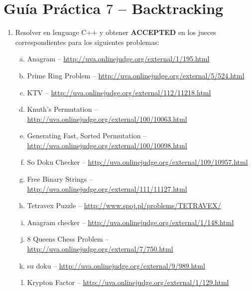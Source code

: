 




\section*{Gu\'ia Pr\'actica $7$ -- Backtracking}

\begin{enumerate}[1 -]
	
	\item Resolver en lenguage C++ y obtener \textbf{ACCEPTED} en los jueces correspondientes para los siguientes problemas:
	
	\begin{enumerate}[a)]
		\item Anagram -- \href{http://uva.onlinejudge.org/external/1/195.html}{http://uva.onlinejudge.org/external/1/195.html}
		\item Prime Ring Problem -- \href{http://uva.onlinejudge.org/external/5/524.html}{http://uva.onlinejudge.org/external/5/524.html}
		\item KTV -- \href{http://uva.onlinejudge.org/external/112/11218.html}{http://uva.onlinejudge.org/external/112/11218.html}
		\item Knuth’s Permutation -- \href{http://uva.onlinejudge.org/external/100/10063.html}{http://uva.onlinejudge.org/external/100/10063.html}
		\item Generating Fast, Sorted Permutation -- \href{http://uva.onlinejudge.org/external/100/10098.html}{http://uva.onlinejudge.org/external/100/10098.html}
		\item So Doku Checker -- \href{http://uva.onlinejudge.org/external/109/10957.html}{http://uva.onlinejudge.org/external/109/10957.html}
		\item Free Binary Strings -- \href{http://uva.onlinejudge.org/external/111/11127.html}{http://uva.onlinejudge.org/external/111/11127.html}
		\item Tetravex Puzzle -- \href{http://www.spoj.pl/problems/TETRAVEX/}{http://www.spoj.pl/problems/TETRAVEX/}
		\item Anagram checker -- \href{http://uva.onlinejudge.org/external/1/148.html}{http://uva.onlinejudge.org/external/1/148.html}
		\item 8 Queens Chess Problem  -- \href{http://uva.onlinejudge.org/external/7/750.html}{http://uva.onlinejudge.org/external/7/750.html}

		\item su doku -- \href{http://uva.onlinejudge.org/external/9/989.html}{http://uva.onlinejudge.org/external/9/989.html}
		\item Krypton Factor -- \href{http://uva.onlinejudge.org/external/1/129.html}{http://uva.onlinejudge.org/external/1/129.html}
	\end{enumerate}

\end{enumerate}






